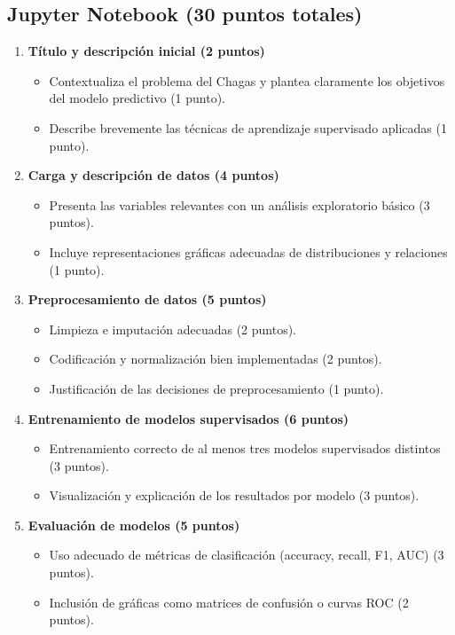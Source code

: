 \documentclass[a4,11pt]{aleph-notas}
\begin{document}
\subsection*{Jupyter Notebook (30 puntos totales)}
\begin{enumerate}[leftmargin=*,label=\textbf{\arabic*.}]
    \item \textbf{Título y descripción inicial (2 puntos)}
    \begin{itemize}[leftmargin=*]
        \item Contextualiza el problema del Chagas y plantea claramente los objetivos del modelo predictivo (1 punto).
        \item Describe brevemente las técnicas de aprendizaje supervisado aplicadas (1 punto).
    \end{itemize}

    \item \textbf{Carga y descripción de datos (4 puntos)}
    \begin{itemize}[leftmargin=*]
        \item Presenta las variables relevantes con un análisis exploratorio básico (3 puntos).
        \item Incluye representaciones gráficas adecuadas de distribuciones y relaciones (1 punto).
    \end{itemize}

    \item \textbf{Preprocesamiento de datos (5 puntos)}
    \begin{itemize}[leftmargin=*]
        \item Limpieza e imputación adecuadas (2 puntos).
        \item Codificación y normalización bien implementadas (2 puntos).
        \item Justificación de las decisiones de preprocesamiento (1 punto).
    \end{itemize}

    \item \textbf{Entrenamiento de modelos supervisados (6 puntos)}
    \begin{itemize}[leftmargin=*]
        \item Entrenamiento correcto de al menos tres modelos supervisados distintos (3 puntos).
        \item Visualización y explicación de los resultados por modelo (3 puntos).
    \end{itemize}

    \item \textbf{Evaluación de modelos (5 puntos)}
    \begin{itemize}[leftmargin=*]
        \item Uso adecuado de métricas de clasificación (accuracy, recall, F1, AUC) (3 puntos).
        \item Inclusión de gráficas como matrices de confusión o curvas ROC (2 puntos).
    \end{itemize}


\end{enumerate}
\end{document}
